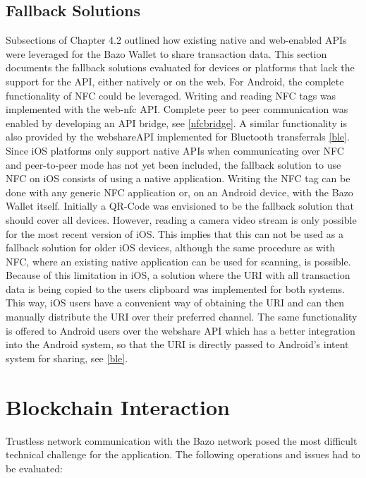 \subsection{Fallback Solutions}\label{fallback}
Subsections of Chapter 4.2 outlined how existing native and web-enabled APIs were leveraged for the Bazo Wallet to share transaction data. This section documents the fallback solutions evaluated for devices or platforms that lack the support for the API, either natively or on the web.
For Android, the complete functionality of NFC could be leveraged. Writing and reading NFC tags was implemented with the web-nfc API. Complete peer to peer communication was enabled by developing an API bridge, see \ref{nfcbridge}. A similar functionality is also provided by the webshareAPI implemented for Bluetooth transferrals \ref{ble}.
Since iOS platforms only support native APIs when communicating over NFC and peer-to-peer mode has not yet been included, the fallback solution to use NFC on iOS consists of using a native application. Writing the NFC tag can be done with any generic NFC application or, on an Android device, with the Bazo Wallet itself.
Initially a QR-Code was envisioned to be the fallback solution that should cover all devices. However, reading a camera video stream is only possible for the most recent version of iOS. This implies that this can not be used as a fallback solution for older iOS devices, although the same procedure as with NFC, where an existing native application can be used for scanning, is possible.
Because of this limitation in iOS, a solution where the URI with all transaction data is being copied to the users clipboard was implemented for both systems. This way, iOS users have a convenient way of obtaining the URI and can then manually distribute the URI over their preferred channel. The same functionality is offered to Android users over the webshare API which has a better integration into the Android system, so that the URI is directly passed to Android's intent system for sharing, see \ref{ble}.

\section{Blockchain Interaction}\label{blockchaininteraction}
Trustless network communication with the Bazo network posed the most difficult technical challenge for the application. The following operations and issues had to be evaluated:

